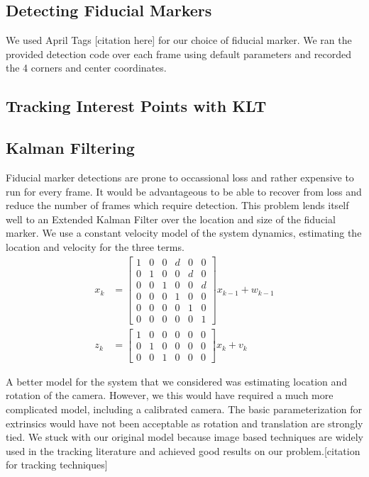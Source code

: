 \documentclass[12pt]{article}
\begin{document}
\subsection{Detecting Fiducial Markers}
We used April Tags [citation here] for our choice of fiducial marker. We ran the provided detection code over each frame using default parameters and recorded the 4 corners and center coordinates.
\subsection{Tracking Interest Points with KLT}

\subsection{Kalman Filtering}
Fiducial marker detections are prone to occassional loss and rather expensive to run for every frame.  It would be advantageous to be able to recover from loss and reduce the number of frames which require detection.  This problem lends itself well to an Extended Kalman Filter over the location and size of the fiducial marker.  We use a constant velocity model of the system dynamics, estimating the location and velocity for the three terms.  
\begin{align}
x_k &= \left[ \begin{array}{cccccc} 
1 & 0 & 0 & d & 0 & 0 \\
0 & 1 & 0 & 0 & d & 0 \\
0 & 0 & 1 & 0 & 0 & d \\
0 & 0 & 0 & 1 & 0 & 0\\
0 & 0 & 0 & 0 & 1 & 0\\
0 & 0 & 0 & 0 & 0 & 1
\end{array}\right] x_{k-1} + w_{k-1}\\
z_k &= \left[ \begin{array}{cccccc}
1 & 0 & 0 & 0 & 0 & 0\\
0 & 1 & 0 & 0 & 0 & 0\\
0 & 0 & 1 & 0 & 0 & 0\end{array}\right] x_k + v_{k}
\end{align}

A better model for the system that we considered was estimating location and rotation of the camera.  However, we this would have required a much more complicated model, including a calibrated camera.  The basic parameterization for extrinsics would have not been acceptable as rotation and translation are strongly tied.  We stuck with our original model because image based techniques are widely used in the tracking literature and achieved good results on our problem.[citation for tracking techniques]
\end{document}
